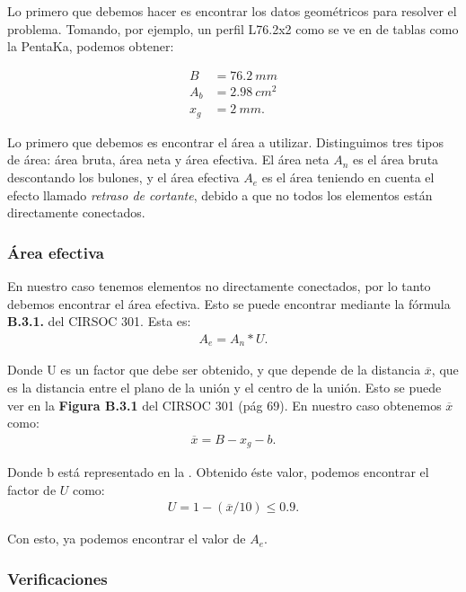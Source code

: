 \documentclass[../main.tex]{subfiles}
\begin{document}
Lo primero que debemos hacer es encontrar los datos geométricos para resolver
el problema. Tomando, por ejemplo, un perfil L76.2x2 como se ve en 
de tablas como la PentaKa, podemos obtener:

\begin{align*}
  B &= \SI{76.2}{mm} \tag{Ancho} \\[5pt]
  A_b &= \SI{2.98}{cm^2} \tag{Área bruta} \\[5pt]
  x_g &= \SI{2}{mm} \tag{Centro de gravedad}
.\end{align*}

Lo primero que debemos es encontrar el área a utilizar. Distinguimos tres tipos
de área: área bruta, área neta y área efectiva. El área neta $A_n$ es el área
bruta descontando los bulones, y el área efectiva  $A_e$ es el área teniendo en
cuenta el efecto llamado  \textit{retraso de cortante}, debido a que no todos 
los elementos están directamente conectados.

\subsubsection{Área efectiva}

En nuestro caso tenemos elementos no directamente conectados, por lo tanto
debemos encontrar el área efectiva. Esto se puede encontrar mediante la fórmula
\textbf{B.3.1.} del CIRSOC 301. Esta es:
\begin{align*}
  A_e = A_n * U
.\end{align*}

Donde U es un factor que debe ser obtenido, y que depende de la distancia 
$\overline{x}$, que es la distancia entre el plano de la unión y el centro de 
la unión. Esto se puede ver en la \textbf{Figura B.3.1} del CIRSOC 301 (pág 69).
En nuestro caso obtenemos $\overline{x}$ como:
\begin{align*}
  \overline{x} = B - x_g - b
.\end{align*}

Donde b está representado en la . Obtenido éste valor, podemos
encontrar el factor de $U$ como:
 \begin{align*}
   U = 1 - (\overline{x} / 10) \leq 0.9
.\end{align*}

Con esto, ya podemos encontrar el valor de $A_e$.

\subsubsection{Verificaciones}
\end{document}
